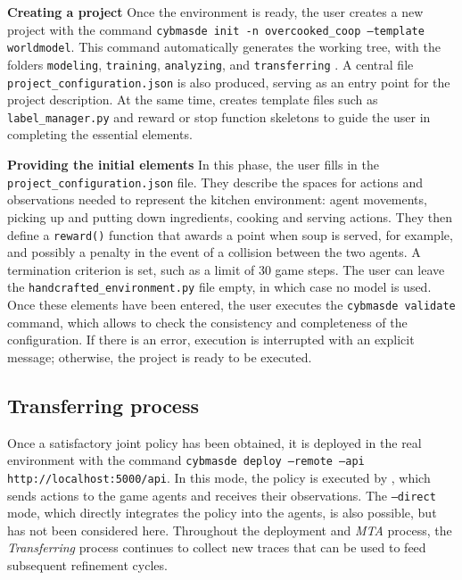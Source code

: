 \noindent
\textbf{Creating a project} \quad
Once the environment is ready, the user creates a new project with the command \texttt{cybmasde init -n overcooked_coop --template worldmodel}. This command automatically generates the working tree, with the folders \texttt{modeling}, \texttt{training}, \texttt{analyzing}, and \texttt{transferring} . A central file \texttt{project_configuration.json} is also produced, serving as an entry point for the project description. At the same time,  creates template files such as \texttt{label_manager.py} and reward or stop function skeletons to guide the user in completing the essential elements.

\noindent
\textbf{Providing the initial elements} \quad
In this phase, the user fills in the \texttt{project_configuration.json} file. They describe the spaces for actions and observations needed to represent the kitchen environment: agent movements, picking up and putting down ingredients, cooking and serving actions. They then define a \texttt{reward()} function that awards a point when soup is served, for example, and possibly a penalty in the event of a collision between the two agents. A termination criterion is set, such as a limit of 30 game steps. The user can leave the \texttt{handcrafted_environment.py} file empty, in which case no  model is used. Once these elements have been entered, the user executes the \texttt{cybmasde validate} command, which allows  to check the consistency and completeness of the configuration. If there is an error, execution is interrupted with an explicit message; otherwise, the project is ready to be executed.

\subsection{Transferring process}
Once a satisfactory joint policy has been obtained, it is deployed in the real environment with the command \texttt{cybmasde deploy --remote --api http://localhost:5000/api}. In this mode, the policy is executed by , which sends actions to the game agents and receives their observations. The \texttt{--direct} mode, which directly integrates the policy into the agents, is also possible, but has not been considered here. Throughout the deployment and \textit{MTA} process, the \textit{Transferring} process continues to collect new traces that can be used to feed subsequent refinement cycles.

